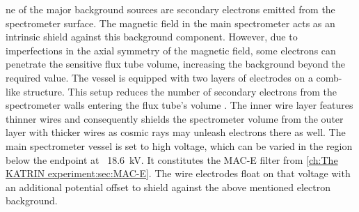       ne of the major background sources are secondary electrons emitted from the spectrometer surface. The magnetic field in the main spectrometer acts as an intrinsic shield against this background component. However, due to imperfections in the axial symmetry of the magnetic field, some electrons can penetrate the sensitive flux tube volume, increasing the background beyond the required value. The vessel is equipped with two layers of electrodes on a comb-like structure. This setup reduces the number of secondary electrons from the spectrometer walls entering the flux tube's volume \cite{wireElectrodeSystem}. The inner wire layer features thinner wires and consequently shields the spectrometer volume from the outer layer with thicker wires as cosmic rays may unleash electrons there as well.
      The main spectrometer vessel is set to high voltage, which can be varied in the region below the endpoint at ~\SI{18.6}{\kilo\volt}. It constitutes the MAC-E filter from \ref{ch:The KATRIN experiment:sec:MAC-E}. The wire electrodes float on that voltage with an additional potential offset to shield against the above mentioned electron background.
